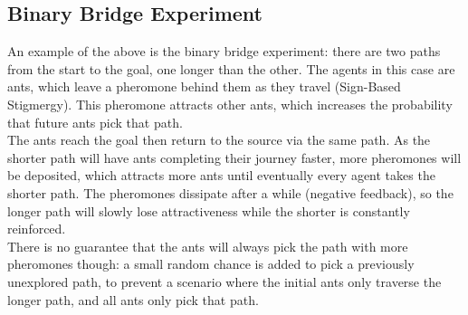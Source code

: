 \subsection{Binary Bridge Experiment}
An example of the above is the binary bridge experiment: there are two paths from the start to the goal, one longer than the other. The agents in this case are ants, which leave a pheromone behind them as they travel (Sign-Based Stigmergy). This pheromone attracts other ants, which increases the probability that future ants pick that path.\\
The ants reach the goal then return to the source via the same path. As the shorter path will have ants completing their journey faster, more pheromones will be deposited, which attracts more ants until eventually every agent takes the shorter path. The pheromones dissipate after a while (negative feedback), so the longer path will slowly lose attractiveness while the shorter is constantly reinforced.\\ 
There is no guarantee that the ants will always pick the path with more pheromones though: a small random chance is added to pick a previously  unexplored path, to prevent a scenario where the initial ants only traverse the longer path, and all ants only pick that path.